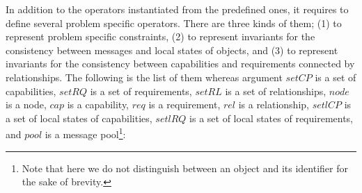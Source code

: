 \documentclass[12pt]{report}
\begin{document}
In addition to the operators instantiated from the predefined ones, it
requires to define several problem specific operators. There are three
kinds of them; (1) to represent problem specific constraints, (2) to
represent invariants for the consistency between messages and local
states of objects, and (3) to represent invariants for the consistency
between capabilities and requirements connected by relationships.  The
following is the list of them whereas argument $setCP$ is a set of
capabilities, $setRQ$ is a set of requirements, $setRL$ is a set of
relationships, $node$ is a node, $cap$ is a capability, $req$ is a
requirement, $rel$ is a relationship, $setlCP$ is a set of local
states of capabilities, $setlRQ$ is a set of local states of
requirements, and $pool$ is a message pool\footnote{Note that here we
  do not distinguish between an object and its identifier for the sake
  of brevity.}:
\end{document}
